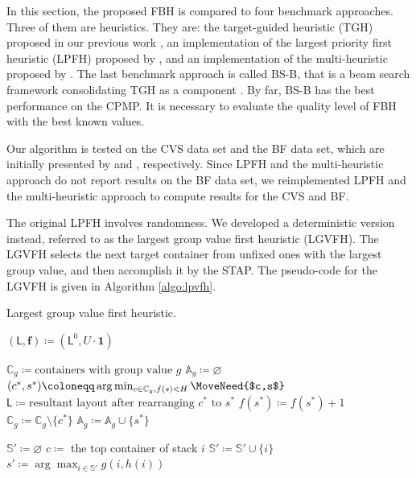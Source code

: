\documentclass[review,3p,times,12pt,number]{elsarticle}\usepackage{amsmath}\usepackage{amssymb}
\renewcommand{\citet}[1]{\citeauthor{#1} \citep{#1}}
\renewcommand{\gets}{\coloneqq}
\newcommand{\setalgo}{\linespread{1}\fontsize{10}{12}\selectfont}
\begin{document}
In this section, the proposed FBH is compared to four benchmark approaches. Three of them are heuristics. They are: the target-guided heuristic (TGH) proposed in our previous work \citep{wang2015}, an implementation of the largest priority first heuristic (LPFH) proposed by \citet{exp2012}, and an implementation of the multi-heuristic proposed by \citet{jovanovic2014}. The last benchmark approach is called BS-B, that is a beam search framework consolidating TGH as a component \citep{wang2015}. By far, BS-B has the best performance on the CPMP\@. It is necessary to evaluate the quality level of FBH with the best known values.

Our algorithm is tested on the CVS data set and the BF data set, which are initially presented by \citet{cas2011} and \citet{bort2012}, respectively.
Since LPFH and the multi-heuristic approach do not report results on the BF data set, we reimplemented LPFH and the multi-heuristic approach to compute results for the CVS and BF.

The original LPFH involves randomness. We developed a deterministic version instead, referred to as the largest group value first heuristic (LGVFH). The LGVFH selects the next target container from unfixed ones with the largest group value, and then accomplish it by the STAP\@. The pseudo-code for the LGVFH is given in Algorithm \ref{algo:lpvfh}.

\begin{algorithm*}[htbp]
\caption{Largest group value first heuristic.}
\label{algo:lpvfh}


\setalgo


\Begin
{
  $(\mathsf{L},\boldsymbol{f})\gets (\mathsf{L}^0,U\cdot\boldsymbol{1})$\;

  {
    $\mathbb{C}_g\gets\textrm{containers with group value $g$}$\;
    $\mathbb{A}_g\gets\varnothing$
    {
      $(c^*, s^*)\gets \arg\min_{c\in\mathbb{C}_g, f(s)<H} \MoveNeed{$c,s$}$\;
      $\mathsf{L} \gets \textrm{resultant layout after rearranging $c^*$ to $s^*$}$\;
      $f(s^*)\gets f(s^*)+1$\;
      $\mathbb{C}_g\gets\mathbb{C}_g\setminus\{c^*\}$\;
      $\mathbb{A}_g\gets \mathbb{A}_g\cup \{s^*\}$\;
    }
    {
    	\;
    }
  }
}



{
  {
    $\mathbb{S}'\gets\varnothing$\;
    {
      $c\gets$ the top container of stack $i$\;
      {
        $\mathbb{S}'\gets \mathbb{S}'\cup \{i\}$\;
      }
    }
    {
      $s'\gets \arg\max_{i\in\mathbb{S}'} g(i,h(i))$\;
      \;
    }
    {
      \Break\;
    }
  }
}


\end{algorithm*}
\end{document}
